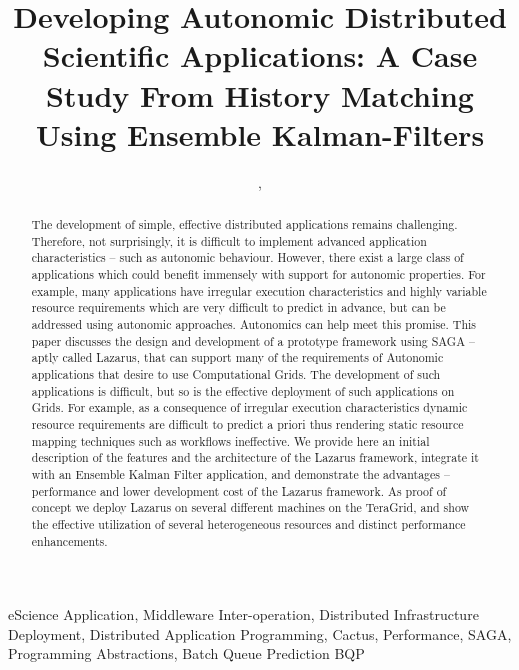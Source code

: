 \documentclass[conference,final]{IEEEtran}
\begin{document}
\title{\large Developing Autonomic Distributed Scientific
  Applications: A Case Study From History Matching Using Ensemble
  Kalman-Filters}
  
\author{,
    
}
\maketitle
 \begin{abstract}
   The development of simple, effective distributed applications
   remains challenging.  Therefore, not surprisingly, it is difficult
   to implement advanced application characteristics -- such as
   autonomic behaviour. However, there exist a large class of
   applications which could benefit immensely with support for
   autonomic properties.  For example, many applications have
   irregular execution characteristics and highly variable resource
   requirements which are very difficult to predict in advance, but
   can be addressed using autonomic approaches.  Autonomics can help
   meet this promise. This paper discusses the design and development
   of a prototype framework using SAGA -- aptly called Lazarus, that
   can support many of the requirements of Autonomic applications that
   desire to use Computational Grids.  The development of such
   applications is difficult, but so is the effective deployment of
   such applications on Grids.  For example, as a consequence of
   irregular execution characteristics dynamic resource requirements
   are difficult to predict a priori thus rendering static resource
   mapping techniques such as workflows ineffective.  We provide here
   an initial description of the features and the architecture of the
   Lazarus framework, integrate it with an Ensemble Kalman Filter
   application, and demonstrate the advantages -- performance and
   lower development cost of the Lazarus framework.  As proof of
   concept we deploy Lazarus on several different machines on the
   TeraGrid, and show the effective utilization of several
   heterogeneous resources and distinct performance enhancements.
 \end{abstract}
 \begin{keywords}
   eScience Application, Middleware Inter-operation, Distributed
   Infrastructure Deployment, Distributed Application Programming,
   Cactus, Performance, SAGA, Programming Abstractions, Batch Queue
   Prediction BQP
 \end{keywords}
\end{document}
